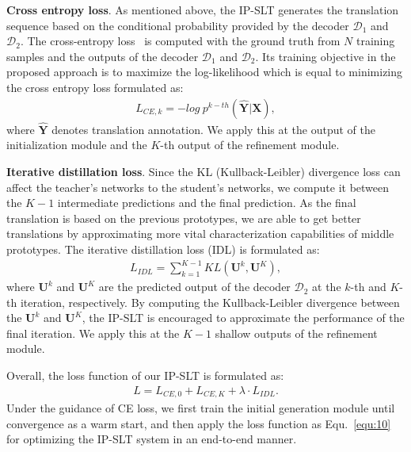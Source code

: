 \documentclass[10pt,twocolumn,letterpaper]{article}
\begin{document}
    \smallskip
    \noindent \textbf{Cross entropy loss}.
    As mentioned above, the IP-SLT generates the translation sequence based on the conditional probability provided by the decoder $\mathcal{D}_1$ and $\mathcal{D}_2$. The cross-entropy loss~\cite{vaswani2017attention} is computed with the ground truth from $N$ training samples and the outputs of the decoder $\mathcal{D}_1$ and $\mathcal{D}_2$. Its training objective in the proposed approach is to maximize the log-likelihood which is equal to minimizing the cross entropy loss formulated as:\vspace{-1mm}
    \begin{equation}
    \begin{aligned}
    \label{equ:8}
    L_{CE,k}=-log~p^{k-th}(\hat{\bm{Y}}|\bm{X}), 
    \end{aligned}
    \end{equation}
    where $\hat{\bm{Y}}$ denotes translation annotation.
    We apply this at the output of the initialization module and the $K$-th output of the refinement module.

    \smallskip
    \noindent \textbf{Iterative distillation loss}.
    Since the KL (Kullback-Leibler) divergence loss can affect the teacher's networks to the student's networks, we compute it between the $K-1$ intermediate predictions and the final prediction. As the final translation is based on the previous prototypes, we are able to get better translations by approximating more vital characterization capabilities of middle prototypes. The iterative distillation loss (IDL) is formulated  as:
    \begin{equation}
    \begin{aligned}
    \label{equ:9}
    L_{IDL}= \sum_{k=1}^{K-1}KL(\bm{U}^{k},\bm{U}^{K}),
    \end{aligned}
    \end{equation}
    where $\bm{U}^{k}$ and $\bm{U}^{K}$ are the predicted output of the decoder $\mathcal{D}_2$ at the $k$-th and $K$-th iteration, respectively. 
    By computing the Kullback-Leibler divergence between the $\bm{U}^{k}$ and $\bm{U}^{K}$, the IP-SLT is encouraged to approximate the performance of the final iteration.
    We apply this at the $K-1$ shallow outputs of the refinement module.
    
    Overall, the loss function of our IP-SLT is formulated as:
    \begin{equation}
    \begin{aligned}
    \label{equ:10}
    L=L_{CE,0}+L_{CE,K}+\lambda \cdot L_{IDL}.
    \end{aligned}
    \end{equation}
    Under the guidance of CE loss, we first train the initial generation module until convergence as a warm start, and then apply the loss function as Equ.~\eqref{equ:10} for optimizing the IP-SLT system in an end-to-end manner. 
\end{document}
